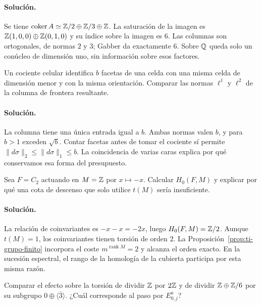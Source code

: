 \paragraph{Solución.}
Se tiene
$\operatorname{coker}A\simeq\mathbb{Z}/2\oplus\mathbb{Z}/3\oplus\mathbb{Z}$.
La saturación de la imagen es
$\mathbb{Z}(1,0,0)\oplus\mathbb{Z}(0,1,0)$ y su índice sobre la imagen
es $6$. Las columnas son ortogonales, de normas $2$ y $3$;
Gabber da exactamente $6$. Sobre $\mathbb{Q}$ queda solo un
conúcleo de dimensión uno, sin información sobre esos factores.

\begin{ejercicio}
Un cociente celular identifica $b$ facetas de una celda
con una misma celda de dimensión menor y con la misma
orientación. Comparar las normas $\ell^1$ y $\ell^2$
de la columna de frontera resultante.
\end{ejercicio}

\paragraph{Solución.}
La columna tiene una única entrada igual a $b$.
Ambas normas valen $b$, y para $b>1$ exceden $\sqrt b$.
Contar facetas antes de tomar el cociente sí permite
$\|d\sigma\|_2\le\|d\sigma\|_1\le b$.
La coincidencia de varias caras explica por qué conservamos
esa forma del presupuesto.

\begin{ejercicio}
Sea $F=C_2$ actuando en $M=\mathbb{Z}$ por $x\mapsto-x$.
Calcular $H_0(F,M)$ y explicar por qué una cota de
descenso que solo utilice $t(M)$ sería insuficiente.
\end{ejercicio}

\paragraph{Solución.}
La relación de coinvariantes es $-x-x=-2x$, luego
$H_0(F,M)=\mathbb{Z}/2$. Aunque $t(M)=1$, los coinvariantes
tienen torsión de orden $2$.
La Proposición~\ref{prop:ti-grupo-finito} incorpora el coste
$m^{\operatorname{rank}M}=2$ y alcanza el orden exacto.
En la sucesión espectral, el rango de la homología de la
cubierta participa por esta misma razón.

\begin{ejercicio}
Comparar el efecto sobre la torsión de dividir $\mathbb{Z}$
por $2\mathbb{Z}$ y de dividir $\mathbb{Z}\oplus\mathbb{Z}/6$ por su subgrupo
$0\oplus\langle\bar3\rangle$.
¿Cuál corresponde al paso por $E^a_{0,j}$?
\end{ejercicio}

